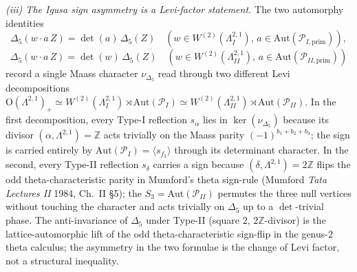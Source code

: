 \begin{lemma}
\emph{(iii) The Igusa sign asymmetry is a Levi-factor statement.}
The two automorphy identities
\[
\Delta_5(w \cdot a\,Z) = \det(a)\,\Delta_5(Z)
\quad (w \in W^{(2)}(\Lambda^{2,1}_I),\, a \in \mathrm{Aut}(\mathcal{P}_{I,\mathrm{prim}})),
\]
\[
\Delta_5(w \cdot a\,Z) = \det(w)\,\Delta_5(Z)
\quad (w \in W^{(2)}(\Lambda^{2,1}_{II}),\, a \in \mathrm{Aut}(\mathcal{P}_{II,\mathrm{prim}}))
\]
record a single Maass character $\nu_{\Delta_5}$ read through two
different Levi decompositions
$\mathrm{O}(\Lambda^{2,1})_+ \simeq W^{(2)}(\Lambda^{2,1}_I) \rtimes
\mathrm{Aut}(\mathcal{P}_I) \simeq W^{(2)}(\Lambda^{2,1}_{II}) \rtimes
\mathrm{Aut}(\mathcal{P}_{II})$. In the first decomposition, every
Type-I reflection $s_\alpha$ lies in $\ker(\nu_{\Delta_5})$ because
its divisor $(\alpha, \Lambda^{2,1}) = \mathbb{Z}$ acts trivially
on the Maass parity $(-1)^{b_1 + b_2 + b_3}$; the sign is carried
entirely by $\mathrm{Aut}(\mathcal{P}_I) = \langle s_{f_3}\rangle$
through its determinant character. In the second, every Type-II
reflection $s_\delta$ carries a sign because
$(\delta, \Lambda^{2,1}) = 2\mathbb{Z}$ flips the odd
theta-characteristic parity in Mumford's theta sign-rule (Mumford
\emph{Tata Lectures II} 1984, Ch.~II \S5); the $S_3 =
\mathrm{Aut}(\mathcal{P}_{II})$ permutes the three null vertices
without touching the character and acts trivially on $\Delta_5$
up to a $\det$-trivial phase. The anti-invariance of $\Delta_5$
under Type-II (square $2$, $2\mathbb{Z}$-divisor) is the
lattice-automorphic lift of the odd theta-characteristic
sign-flip in the genus-$2$ theta calculus; the asymmetry in the
two formulae is the change of Levi factor, not a structural
inequality.


\end{lemma}
